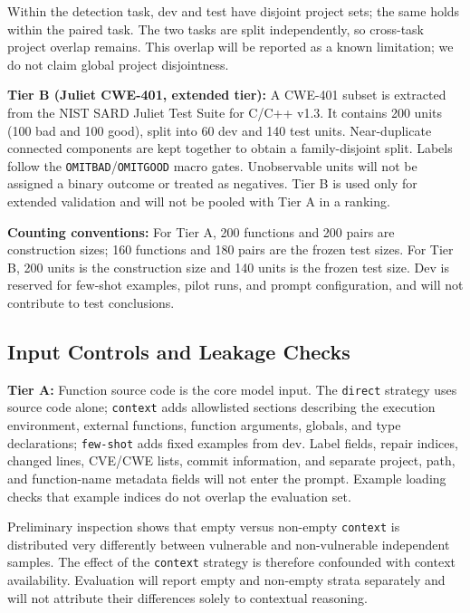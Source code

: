 \documentclass[conference]{IEEEtran}
\begin{document}
Within the detection task, dev and test have disjoint project sets; the same holds within the paired task. The two tasks are split independently, so cross-task project overlap remains. This overlap will be reported as a known limitation; we do not claim global project disjointness.

\textbf{Tier B (Juliet CWE-401, extended tier):} A CWE-401 subset is extracted from the NIST SARD Juliet Test Suite for C/C++ v1.3. It contains 200 units (100 bad and 100 good), split into 60 dev and 140 test units. Near-duplicate connected components are kept together to obtain a family-disjoint split. Labels follow the \texttt{OMITBAD}/\texttt{OMITGOOD} macro gates. Unobservable units will not be assigned a binary outcome or treated as negatives. Tier B is used only for extended validation and will not be pooled with Tier A in a ranking.

\textbf{Counting conventions:} For Tier A, 200 functions and 200 pairs are construction sizes; 160 functions and 180 pairs are the frozen test sizes. For Tier B, 200 units is the construction size and 140 units is the frozen test size. Dev is reserved for few-shot examples, pilot runs, and prompt configuration, and will not contribute to test conclusions.

\subsection{Input Controls and Leakage Checks}
\label{sec:eval-input}

\textbf{Tier A:} Function source code is the core model input. The \texttt{direct} strategy uses source code alone; \texttt{context} adds allowlisted sections describing the execution environment, external functions, function arguments, globals, and type declarations; \texttt{few-shot} adds fixed examples from dev. Label fields, repair indices, changed lines, CVE/CWE lists, commit information, and separate project, path, and function-name metadata fields will not enter the prompt. Example loading checks that example indices do not overlap the evaluation set.

Preliminary inspection shows that empty versus non-empty \texttt{context} is distributed very differently between vulnerable and non-vulnerable independent samples. The effect of the \texttt{context} strategy is therefore confounded with context availability. Evaluation will report empty and non-empty strata separately and will not attribute their differences solely to contextual reasoning.
\end{document}
